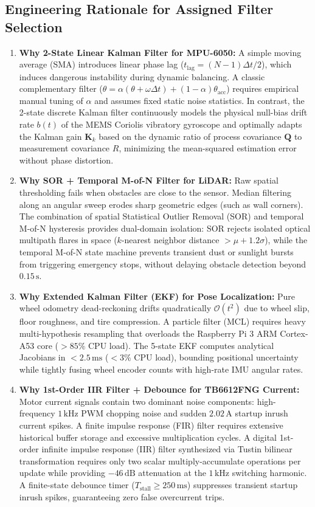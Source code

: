 \documentclass[11pt, a4paper]{article}
\begin{document}
\subsection{Engineering Rationale for Assigned Filter Selection}
\begin{enumerate}
    \item \textbf{Why 2-State Linear Kalman Filter for MPU-6050:} A simple moving average (SMA) introduces linear phase lag ($t_{\text{lag}} = (N-1)\Delta t / 2$), which induces dangerous instability during dynamic balancing. A classic complementary filter ($\theta = \alpha (\theta + \omega \Delta t) + (1-\alpha)\theta_{\text{acc}}$) requires empirical manual tuning of $\alpha$ and assumes fixed static noise statistics. In contrast, the 2-state discrete Kalman filter continuously models the physical null-bias drift rate $b(t)$ of the MEMS Coriolis vibratory gyroscope and optimally adapts the Kalman gain $\mathbf{K}_k$ based on the dynamic ratio of process covariance $\mathbf{Q}$ to measurement covariance $R$, minimizing the mean-squared estimation error without phase distortion.
    \item \textbf{Why SOR + Temporal M-of-N Filter for LiDAR:} Raw spatial thresholding fails when obstacles are close to the sensor. Median filtering along an angular sweep erodes sharp geometric edges (such as wall corners). The combination of spatial Statistical Outlier Removal (SOR) and temporal M-of-N hysteresis provides dual-domain isolation: SOR rejects isolated optical multipath flares in space ($k$-nearest neighbor distance $> \mu + 1.2\sigma$), while the temporal M-of-N state machine prevents transient dust or sunlight bursts from triggering emergency stops, without delaying obstacle detection beyond $0.15\,\text{s}$.
    \item \textbf{Why Extended Kalman Filter (EKF) for Pose Localization:} Pure wheel odometry dead-reckoning drifts quadratically $\mathcal{O}(t^2)$ due to wheel slip, floor roughness, and tire compression. A particle filter (MCL) requires heavy multi-hypothesis resampling that overloads the Raspberry Pi 3 ARM Cortex-A53 core ($>85\%$ CPU load). The 5-state EKF computes analytical Jacobians in $<2.5\,\text{ms}$ ($<3\%$ CPU load), bounding positional uncertainty while tightly fusing wheel encoder counts with high-rate IMU angular rates.
    \item \textbf{Why 1st-Order IIR Filter + Debounce for TB6612FNG Current:} Motor current signals contain two dominant noise components: high-frequency $1\,\text{kHz}$ PWM chopping noise and sudden $2.02\,\text{A}$ startup inrush current spikes. A finite impulse response (FIR) filter requires extensive historical buffer storage and excessive multiplication cycles. A digital 1st-order infinite impulse response (IIR) filter synthesized via Tustin bilinear transformation requires only two scalar multiply-accumulate operations per update while providing $-46\,\text{dB}$ attenuation at the $1\,\text{kHz}$ switching harmonic. A finite-state debounce timer ($T_{\text{stall}} \ge 250\,\text{ms}$) suppresses transient startup inrush spikes, guaranteeing zero false overcurrent trips.

\end{enumerate}
\end{document}
